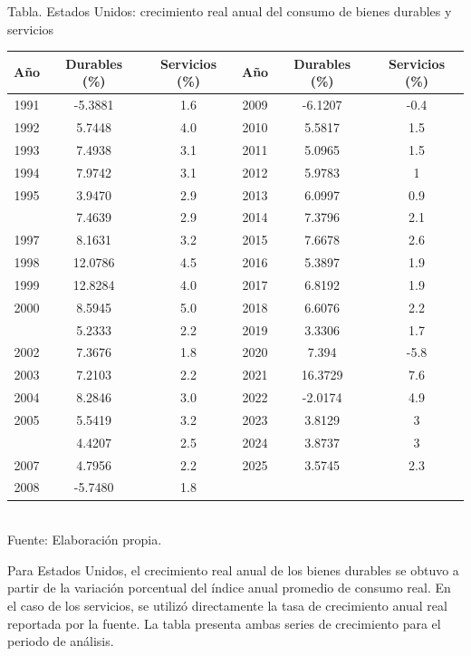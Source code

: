 \documentclass{article}\usepackage[]{graphicx}\usepackage[]{xcolor}
\begin{document}
\begin{center}
Tabla. Estados Unidos: crecimiento real anual del consumo de bienes durables y servicios
\end{center}
\begin{center}

\begin{tabular}{cccccc}
\toprule
Año & Durables (\%) & Servicios (\%) & Año & Durables (\%) & Servicios (\%)\\
\midrule
1991 & -5.3881 & 1.6 & 2009 & -6.1207 & -0.4\\
1992 & 5.7448 & 4.0 & 2010 & 5.5817 & 1.5\\
1993 & 7.4938 & 3.1 & 2011 & 5.0965 & 1.5\\
1994 & 7.9742 & 3.1 & 2012 & 5.9783 & 1\\
1995 & 3.9470 & 2.9 & 2013 & 6.0997 & 0.9\\
\addlinespace
1996 & 7.4639 & 2.9 & 2014 & 7.3796 & 2.1\\
1997 & 8.1631 & 3.2 & 2015 & 7.6678 & 2.6\\
1998 & 12.0786 & 4.5 & 2016 & 5.3897 & 1.9\\
1999 & 12.8284 & 4.0 & 2017 & 6.8192 & 1.9\\
2000 & 8.5945 & 5.0 & 2018 & 6.6076 & 2.2\\
\addlinespace
2001 & 5.2333 & 2.2 & 2019 & 3.3306 & 1.7\\
2002 & 7.3676 & 1.8 & 2020 & 7.394 & -5.8\\
2003 & 7.2103 & 2.2 & 2021 & 16.3729 & 7.6\\
2004 & 8.2846 & 3.0 & 2022 & -2.0174 & 4.9\\
2005 & 5.5419 & 3.2 & 2023 & 3.8129 & 3\\
\addlinespace
2006 & 4.4207 & 2.5 & 2024 & 3.8737 & 3\\
2007 & 4.7956 & 2.2 & 2025 & 3.5745 & 2.3\\
2008 & -5.7480 & 1.8 &  &  & \\
\bottomrule
\end{tabular}
\\[0.3em]
{\footnotesize Fuente: Elaboración propia.}
\end{center}


Para Estados Unidos, el crecimiento real anual de los bienes durables se obtuvo a partir de la variación porcentual del índice anual promedio de consumo real. En el caso de los servicios, se utilizó directamente la tasa de crecimiento anual real reportada por la fuente. La tabla presenta ambas series de crecimiento para el periodo de análisis.
\end{document}
